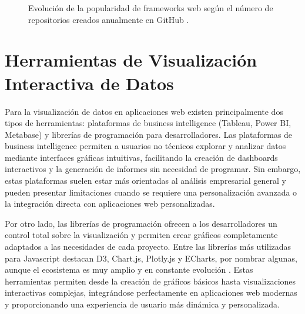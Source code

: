 \begin{figure}[htbp]
\centering
{}
\caption{Evolución de la popularidad de frameworks web según el número de repositorios creados anualmente en GitHub \cite{Swacha2023_WebFrameworks}.}
\label{fig:frameworks_github}
\end{figure}



\section{Herramientas de Visualización Interactiva de Datos}

Para la visualización de datos en aplicaciones web existen principalmente dos tipos de herramientas: plataformas de business intelligence (Tableau, Power BI, Metabase) y librerías de programación para desarrolladores. Las plataformas de business intelligence permiten a usuarios no técnicos explorar y analizar datos mediante interfaces gráficas intuitivas, facilitando la creación de dashboards interactivos y la generación de informes sin necesidad de programar. Sin embargo, estas plataformas suelen estar más orientadas al análisis empresarial general y pueden presentar limitaciones cuando se requiere una personalización avanzada o la integración directa con aplicaciones web personalizadas.

Por otro lado, las librerías de programación ofrecen a los desarrolladores un control total sobre la visualización y permiten crear gráficos completamente adaptados a las necesidades de cada proyecto. Entre las librerías más utilizadas para Javascript destacan D3, Chart.js, Plotly.js y ECharts, por nombrar algunas, aunque el ecosistema es muy amplio y en constante evolución \cite{Monterail2024_JSViz}. Estas herramientas permiten desde la creación de gráficos básicos hasta visualizaciones interactivas complejas, integrándose perfectamente en aplicaciones web modernas y proporcionando una experiencia de usuario más dinámica y personalizada.

